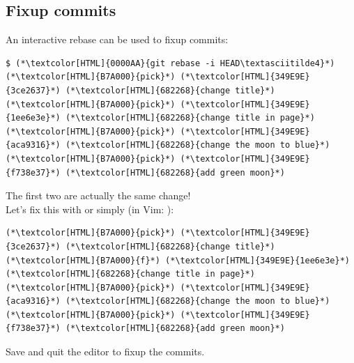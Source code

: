 \subsection{Fixup commits}
\begin{frame}[fragile]
  \subslidetitle
  An interactive rebase can be used to fixup commits:

  \begin{lstlisting}
$ (*\textcolor[HTML]{0000AA}{git rebase -i HEAD\textasciitilde4}*)
(*\textcolor[HTML]{B7A000}{pick}*) (*\textcolor[HTML]{349E9E}{3ce2637}*) (*\textcolor[HTML]{682268}{change title}*)
(*\textcolor[HTML]{B7A000}{pick}*) (*\textcolor[HTML]{349E9E}{1ee6e3e}*) (*\textcolor[HTML]{682268}{change title in page}*)
(*\textcolor[HTML]{B7A000}{pick}*) (*\textcolor[HTML]{349E9E}{aca9316}*) (*\textcolor[HTML]{682268}{change the moon to blue}*)
(*\textcolor[HTML]{B7A000}{pick}*) (*\textcolor[HTML]{349E9E}{f738e37}*) (*\textcolor[HTML]{682268}{add green moon}*)
\end{lstlisting}

  The first two are actually the same change!\\
  Let's fix this with  or simply  (in Vim: ):

  \begin{lstlisting}
(*\textcolor[HTML]{B7A000}{pick}*) (*\textcolor[HTML]{349E9E}{3ce2637}*) (*\textcolor[HTML]{682268}{change title}*)
(*\textcolor[HTML]{B7A000}{f}*) (*\textcolor[HTML]{349E9E}{1ee6e3e}*) (*\textcolor[HTML]{682268}{change title in page}*)
(*\textcolor[HTML]{B7A000}{pick}*) (*\textcolor[HTML]{349E9E}{aca9316}*) (*\textcolor[HTML]{682268}{change the moon to blue}*)
(*\textcolor[HTML]{B7A000}{pick}*) (*\textcolor[HTML]{349E9E}{f738e37}*) (*\textcolor[HTML]{682268}{add green moon}*)
\end{lstlisting}

  Save and quit the editor to fixup the commits.
\end{frame}

